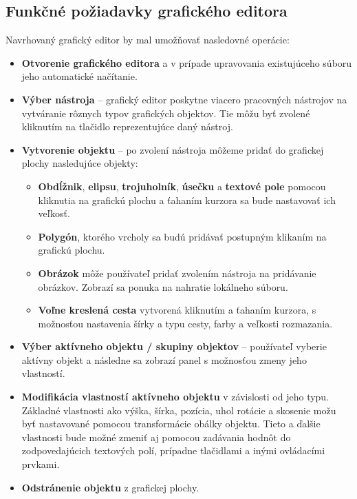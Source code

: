 \subsection{Funkčné požiadavky grafického editora}
Navrhovaný grafický editor by mal umožňovať nasledovné operácie:
\begin{itemize}
	\item \textbf{Otvorenie grafického editora} a v prípade upravovania existujúceho súboru jeho automatické načítanie.
	
	\item \textbf{Výber nástroja} -- grafický editor poskytne viacero pracovných nástrojov na vytváranie rôznych typov grafických objektov. Tie môžu byť zvolené kliknutím na tlačidlo reprezentujúce daný nástroj. 
	
	\item \textbf{Vytvorenie objektu} -- po zvolení nástroja môžeme pridať do grafickej plochy nasledujúce objekty:
	\begin{itemize}
		\item \textbf{Obdĺžnik}, \textbf{elipsu}, \textbf{trojuholník}, \textbf{úsečku} a \textbf{textové pole} pomocou kliknutia na grafickú plochu a  ťahaním kurzora sa bude nastavovať ich veľkosť.
		\item \textbf{Polygón}, ktorého vrcholy sa budú pridávať postupným klikaním na grafickú plochu.
		\item \textbf{Obrázok} môže používateľ pridať zvolením nástroja na pridávanie obrázkov. Zobrazí sa ponuka na nahratie lokálneho súboru.
		\item \textbf{Voľne kreslená cesta} vytvorená kliknutím a ťahaním kurzora, s možnosťou nastavenia šírky a typu cesty, farby a veľkosti rozmazania.
	\end{itemize}
	
	\item \textbf{Výber aktívneho objektu / skupiny objektov} -- používateľ vyberie aktívny objekt a následne sa zobrazí panel s možnosťou zmeny jeho vlastností.
	
	\item \textbf{Modifikácia vlastností aktívneho objektu} v závislosti od jeho typu. Základné vlastnosti ako výška, šírka, pozícia, uhol rotácie a skosenie možu byť nastavované pomocou transformácie obálky objektu. Tieto a ďalšie vlastnosti bude možné zmeniť aj pomocou zadávania hodnôt do zodpovedajúcich textových polí, prípadne tlačidlami a inými ovládacími prvkami.
	
	\item \textbf{Odstránenie objektu} z grafickej plochy. 
	

\end{itemize}
